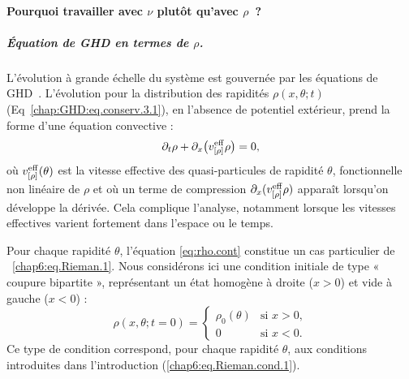 
\paragraph{Pourquoi travailler avec $\nu$ plutôt qu’avec $\rho$~?}
\subparagraph{Équation de GHD en termes de $\rho$.}
L’évolution à grande échelle du système est gouvernée par les équations de GHD~\cite{Bertini2016, CastroAlvaredo2016}. 
L'évolution pour la distribution des rapidités $\rho(x,\theta;t)$ (Eq~\eqref{chap:GHD:eq.conserv.3.1}), en l'absence de potentiel extérieur, prend la forme d’une équation convective :
\begin{equation}
	\label{eq:rho.cont}
	\partial_t \rho + \partial_x \big( v^{\rm eff}_{[\rho]} \rho \big) = 0,
\end{equation}
où $v^{\rm eff}_{[\rho]}(\theta)$ est la vitesse effective des quasi-particules de rapidité $\theta$, fonctionnelle non linéaire de $\rho$ et où un terme de compression $\partial_x (v^{\rm eff}_{[\rho]} \rho)$ apparaît lorsqu’on développe la dérivée. Cela complique l’analyse, notamment lorsque les vitesses effectives varient fortement dans l’espace ou le temps.

\medskip

Pour chaque rapidité $\theta$, l'équation \eqref{eq:rho.cont} constitue un cas particulier de ~\eqref{chap6:eq.Rieman.1}.
Nous considérons ici une condition initiale de type « coupure bipartite », représentant un état homogène à droite ($x>0$) et vide à gauche ($x<0$) :
\begin{equation}
    \label{eq:rho.cont.init}
    \rho(x,\theta;t=0) = 
    \begin{cases}
        \rho_0(\theta) & \text{si } x > 0, \\
        0 & \text{si } x < 0.
    \end{cases}
\end{equation}
Ce type de condition correspond, pour chaque rapidité $\theta$, aux conditions introduites dans l'introduction (\eqref{chap6:eq.Rieman.cond.1}).\\

